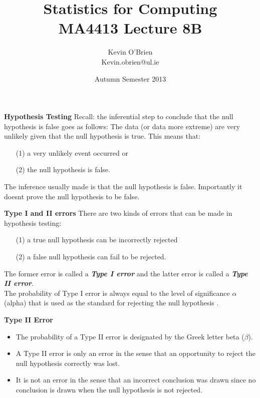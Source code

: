 \documentclass[a4]{beamer}
\title[MA4413]{Statistics for Computing \\ {\normalsize MA4413 Lecture 8B}}
\author[Kevin O'Brien]{Kevin O'Brien \\ {\scriptsize Kevin.obrien@ul.ie}}
\date{Autumn Semester 2013}
\institute[Maths \& Stats]{Dept. of Mathematics \& Statistics, \\ University \textit{of} Limerick}
\begin{document}

\noindent \textbf{Hypothesis Testing}
\large
Recall: the inferential step to conclude that the null hypothesis is false goes as follows: The data (or data more extreme) are very unlikely given that the null hypothesis is true.
\bigskip
This means that:
\begin{itemize}\item [(1)] a very unlikely event occurred or
\item[(2)] the null hypothesis is false. \end{itemize}
The inference usually made is that the null hypothesis is false. Importantly it doesnt prove the null hypothesis to be false.


\noindent \textbf{Type I and II errors}
\large
There are two kinds of errors that can be made in hypothesis testing:
\begin{itemize}
\item[(1)] a true null hypothesis can be incorrectly rejected
\item[(2)] a false null hypothesis can fail to be rejected.
\end{itemize}
The former error is called a \textbf{\emph{Type I error}} and the latter error is called a \textbf{\emph{Type II error}}. \\ \bigskip
The probability of Type I error is always equal to the level of significance $\alpha$ (alpha) that is used as the standard for rejecting the null hypothesis .


\noindent \textbf{Type II Error}
\begin{itemize}

\item The probability of a Type II error is designated by the Greek letter beta ($\beta$).
\item A Type II error is only an error in the sense that an opportunity to reject the null hypothesis correctly was lost.
\item It is not an error in the sense that an incorrect conclusion was drawn since no conclusion is drawn when the null hypothesis is not rejected.
\end{itemize}
\end{document}
